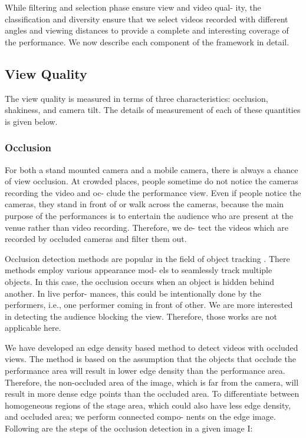 \documentclass{sig-alternate}
\begin{document}
While filtering and selection phase ensure view and video qual-
ity, the classification and diversity ensure that we select videos
recorded with different angles and viewing distances to provide a
complete and interesting coverage of the performance. We now
describe each component of the framework in detail.

\subsection{View Quality}
The view quality is measured in terms of three characteristics:
occlusion, shakiness, and camera tilt. The details of measurement
of each of these quantities is given below.

\subsubsection{Occlusion}
For both a stand mounted camera and a mobile camera, there
is always a chance of view occlusion. At crowded places, people
sometime do not notice the cameras recording the video and oc-
clude the performance view. Even if people notice the cameras,
they stand in front of or walk across the cameras, because the main
purpose of the performances is to entertain the audience who are
present at the venue rather than video recording. Therefore, we de-
tect the videos which are recorded by occluded cameras and filter
them out.

Occlusion detection methods are popular in the field of object
tracking \cite{13,19}. There methods employ various appearance mod-
els to seamlessly track multiple objects. In this case, the occlusion
occurs when an object is hidden behind another. In live perfor-
mances, this could be intentionally done by the performers, i.e.,
one performer coming in front of other. We are more interested in
detecting the audience blocking the view. Therefore, those works
are not applicable here.

We have developed an edge density based method to detect videos
with occluded views. The method is based on the assumption that
the objects that occlude the performance area will result in lower
edge density than the performance area. Therefore, the non-occluded
area of the image, which is far from the camera, will result in more
dense edge points than the occluded area. To differentiate between
homogeneous regions of the stage area, which could also have less edge density, and occluded area; we perform connected compo-
nents on the edge image. Following are the steps of the occlusion
detection in a given image I:
\end{document}

